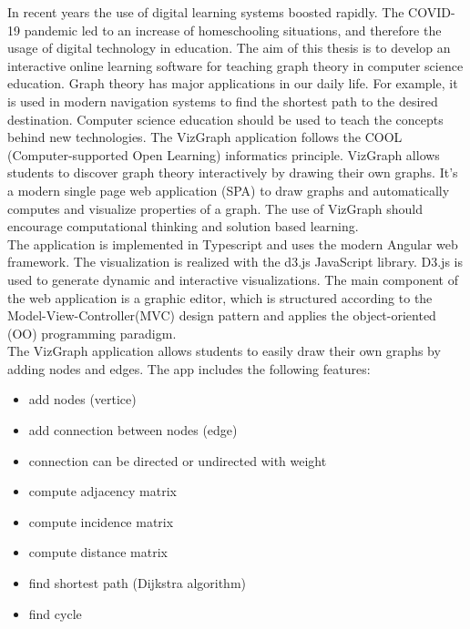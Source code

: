 In recent years the use of digital learning systems boosted rapidly. The COVID-19 pandemic led to an increase of homeschooling situations, and therefore the usage of digital technology in education\cite{Alabdulaziz}. The aim of this thesis is to develop an interactive online learning software for teaching graph theory in computer science education. Graph theory has major applications in our daily life. For example, it is used in modern navigation systems to find the shortest path to the desired destination. Computer science education should be used to teach the concepts behind new technologies. The VizGraph application follows the COOL (Computer-supported Open Learning) informatics principle\cite{SabitzerCoolinfo}\cite{SabitzerCool}. VizGraph allows students to discover graph theory interactively by drawing their own graphs. It’s a modern single page web application (SPA) to draw graphs and automatically computes and visualize properties of a graph. The use of VizGraph should encourage computational thinking and solution based learning.\\ 
The application is implemented in Typescript\cite{bierman2014understanding} and uses the modern Angular\cite{jain2014angularjs} web framework. The visualization is realized with the d3.js\cite{d3js} JavaScript library. D3.js is used to generate dynamic and interactive visualizations. The main component of the web application is a graphic editor, which is structured according to the Model-View-Controller(MVC) design pattern and applies the object-oriented (OO) programming paradigm\cite{mossenbock}.\\ 
The VizGraph application allows students to easily draw their own graphs by adding nodes and edges. The app includes the following features:
\begin{itemize}
\item add nodes (vertice)
\item add connection between nodes (edge)
\item connection can be directed or undirected with weight
\item compute adjacency matrix
\item compute incidence matrix
\item compute distance matrix 
\item find shortest path (Dijkstra algorithm)
\item find cycle
\end{itemize}
